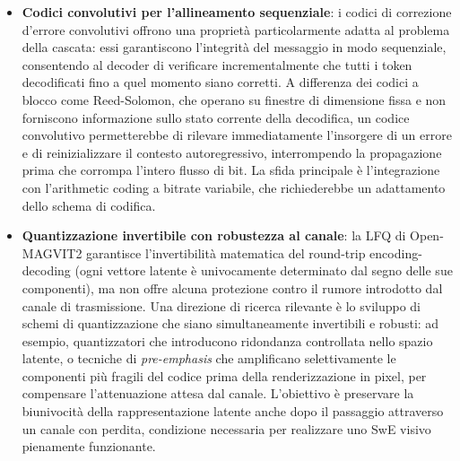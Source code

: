 \begin{itemize}
	\item \textbf{Codici convolutivi per l'allineamento sequenziale}: i codici di correzione d'errore convolutivi offrono una proprietà particolarmente adatta al problema della cascata: essi garantiscono l'integrità del messaggio in modo sequenziale, consentendo al decoder di verificare incrementalmente che tutti i token decodificati fino a quel momento siano corretti. A differenza dei codici a blocco come Reed-Solomon, che operano su finestre di dimensione fissa e non forniscono informazione sullo stato corrente della decodifica, un codice convolutivo permetterebbe di rilevare immediatamente l'insorgere di un errore e di reinizializzare il contesto autoregressivo, interrompendo la propagazione prima che corrompa l'intero flusso di bit. La sfida principale è l'integrazione con l'arithmetic coding a bitrate variabile, che richiederebbe un adattamento dello schema di codifica.
	
	\item \textbf{Quantizzazione invertibile con robustezza al canale}: la LFQ di Open-MAGVIT2 garantisce l'invertibilità matematica del round-trip encoding-decoding (ogni vettore latente è univocamente determinato dal segno delle sue componenti), ma non offre alcuna protezione contro il rumore introdotto dal canale di trasmissione. Una direzione di ricerca rilevante è lo sviluppo di schemi di quantizzazione che siano simultaneamente invertibili e robusti: ad esempio, quantizzatori che introducono ridondanza controllata nello spazio latente, o tecniche di \emph{pre-emphasis} che amplificano selettivamente le componenti più fragili del codice prima della renderizzazione in pixel, per compensare l'attenuazione attesa dal canale. L'obiettivo è preservare la biunivocità della rappresentazione latente anche dopo il passaggio attraverso un canale con perdita, condizione necessaria per realizzare uno SwE visivo pienamente funzionante.
	

\end{itemize}
